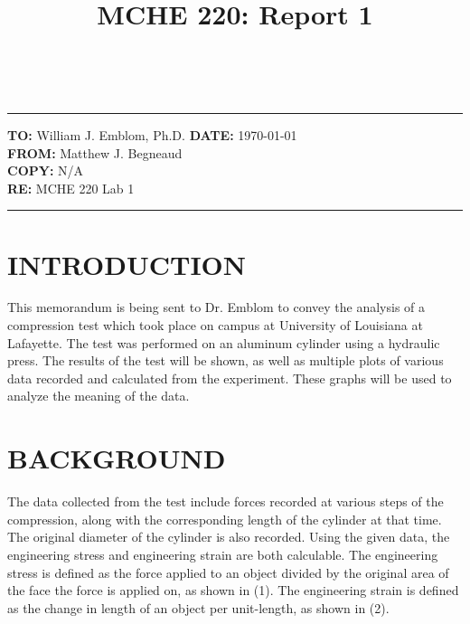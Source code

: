 \documentclass[12pt]{article}
\title{MCHE 220: Report 1}
\begin{document}
\fancyhf{}  
  \renewcommand{\headrulewidth}{0pt}
    \pagestyle{plain}
    
\captionsetup[table]{labelsep=space}

\begin{flushleft}
\hrulefill\\\hrule height 1pt
\vspace{5pt}
\textbf{TO: }William J. Emblom, Ph.D.  \hfill   \textbf{DATE: }\today                
\bigskip\\
\textbf{FROM: }Matthew J. Begneaud
\bigskip\\
\textbf{COPY: }N/A
\bigskip\\
\textbf{RE: }MCHE 220 Lab 1
\vspace{-10pt}
\end{flushleft}
\hrulefill \hrule height 1pt


\section*{\fontsize{12}{12}\selectfont INTRODUCTION}
This memorandum is being sent to Dr. Emblom to convey the analysis of a compression test which took place on campus at University of Louisiana at Lafayette. The test was performed on an aluminum cylinder using a hydraulic press. The results of the test will be shown, as well as multiple plots of various data recorded and calculated from the experiment. These graphs will be used to analyze the meaning of the data.
\bigskip


\section*{\fontsize{12}{12}\selectfont BACKGROUND}
The data collected from the test include forces recorded at various steps of the compression, along with the corresponding length of the cylinder at that time. The original diameter of the cylinder is also recorded. Using the given data, the engineering stress and engineering strain are both calculable. The engineering stress is defined as the force applied to an object divided by the original area of the face the force is applied on, as shown in (1). The engineering strain is defined as the change in length of an object per unit-length, as shown in (2).
\end{document}
